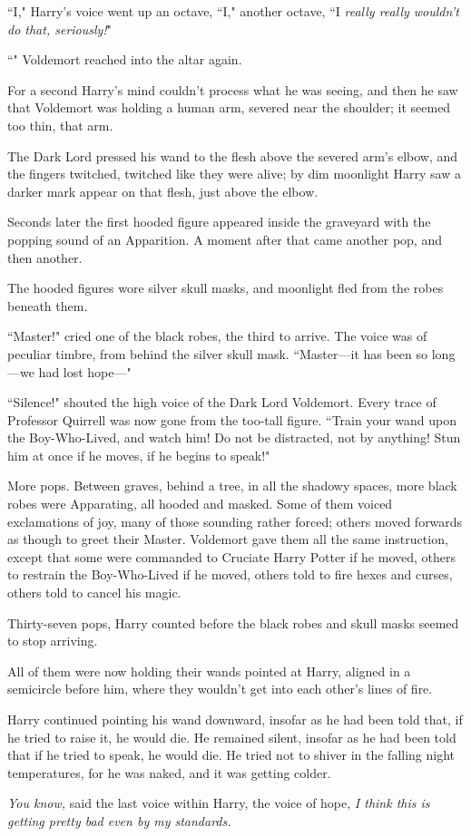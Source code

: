 ``I," Harry's voice went up an octave, ``I," another octave, ``I \emph{really really wouldn't do that, seriously!}"

``" Voldemort reached into the altar again.

For a second Harry's mind couldn't process what he was seeing, and then he saw that Voldemort was holding a human arm, severed near the shoulder; it seemed too thin, that arm.

The Dark Lord pressed his wand to the flesh above the severed arm's elbow, and the fingers twitched, twitched like they were alive; by dim moonlight Harry saw a darker mark appear on that flesh, just above the elbow.

Seconds later the first hooded figure appeared inside the graveyard with the popping sound of an Apparition. A moment after that came another pop, and then another.

The hooded figures wore silver skull masks, and moonlight fled from the robes beneath them.

``Master!" cried one of the black robes, the third to arrive. The voice was of peculiar timbre, from behind the silver skull mask. ``Master—it has been so long—we had lost hope—"

``Silence!" shouted the high voice of the Dark Lord Voldemort. Every trace of Professor Quirrell was now gone from the too-tall figure. ``Train your wand upon the Boy-Who-Lived, and watch him! Do not be distracted, not by anything! Stun him at once if he moves, if he begins to speak!"

More pops. Between graves, behind a tree, in all the shadowy spaces, more black robes were Apparating, all hooded and masked. Some of them voiced exclamations of joy, many of those sounding rather forced; others moved forwards as though to greet their Master. Voldemort gave them all the same instruction, except that some were commanded to Cruciate Harry Potter if he moved, others to restrain the Boy-Who-Lived if he moved, others told to fire hexes and curses, others told to cancel his magic.

Thirty-seven pops, Harry counted before the black robes and skull masks seemed to stop arriving.

All of them were now holding their wands pointed at Harry, aligned in a semicircle before him, where they wouldn't get into each other's lines of fire.

Harry continued pointing his wand downward, insofar as he had been told that, if he tried to raise it, he would die. He remained silent, insofar as he had been told that if he tried to speak, he would die. He tried not to shiver in the falling night temperatures, for he was naked, and it was getting colder.

\emph{You know,} said the last voice within Harry, the voice of hope, \emph{I think this is getting pretty bad even by my standards.}

